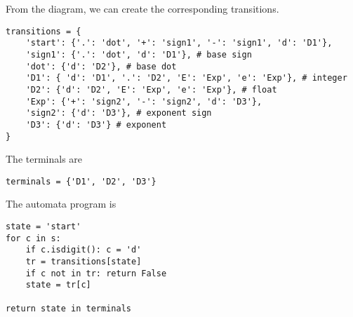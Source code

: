 \documentclass[12pt]{simple_doc}
\begin{document}
    From the diagram, we can create the corresponding transitions.
    \begin{verbatim}
transitions = {
    'start': {'.': 'dot', '+': 'sign1', '-': 'sign1', 'd': 'D1'},
    'sign1': {'.': 'dot', 'd': 'D1'}, # base sign
    'dot': {'d': 'D2'}, # base dot
    'D1': { 'd': 'D1', '.': 'D2', 'E': 'Exp', 'e': 'Exp'}, # integer
    'D2': {'d': 'D2', 'E': 'Exp', 'e': 'Exp'}, # float
    'Exp': {'+': 'sign2', '-': 'sign2', 'd': 'D3'},
    'sign2': {'d': 'D3'}, # exponent sign
    'D3': {'d': 'D3'} # exponent
}
    \end{verbatim}

    The terminals are
    \begin{verbatim}
terminals = {'D1', 'D2', 'D3'}
    \end{verbatim}

    The automata program is
    \begin{verbatim}
state = 'start'
for c in s:
    if c.isdigit(): c = 'd'
    tr = transitions[state]
    if c not in tr: return False
    state = tr[c]

return state in terminals
    \end{verbatim}
\end{document}
